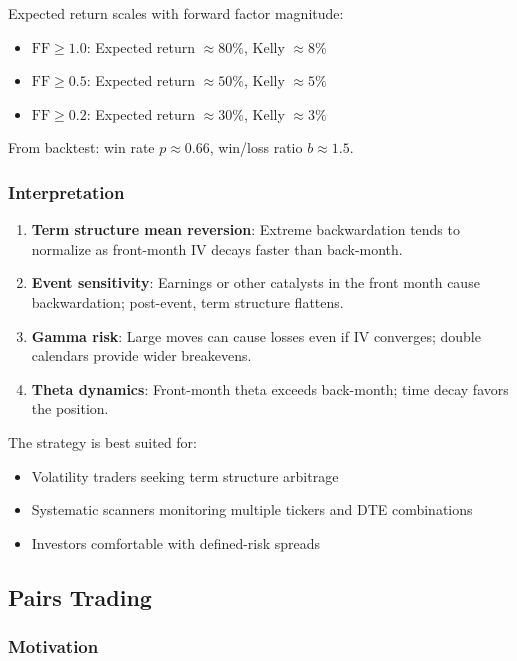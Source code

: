 Expected return scales with forward factor magnitude:
\begin{itemize}
  \item $\text{FF} \geq 1.0$: Expected return $\approx 80\%$, Kelly $\approx 8\%$
  \item $\text{FF} \geq 0.5$: Expected return $\approx 50\%$, Kelly $\approx 5\%$
  \item $\text{FF} \geq 0.2$: Expected return $\approx 30\%$, Kelly $\approx 3\%$
\end{itemize}

From backtest: win rate $p \approx 0.66$, win/loss ratio $b \approx 1.5$.

\subsubsection{Interpretation}

\begin{enumerate}
  \item \textbf{Term structure mean reversion}: Extreme backwardation tends to normalize as front-month IV decays faster than back-month.

  \item \textbf{Event sensitivity}: Earnings or other catalysts in the front month cause backwardation; post-event, term structure flattens.

  \item \textbf{Gamma risk}: Large moves can cause losses even if IV converges; double calendars provide wider breakevens.

  \item \textbf{Theta dynamics}: Front-month theta exceeds back-month; time decay favors the position.
\end{enumerate}

The strategy is best suited for:
\begin{itemize}
  \item Volatility traders seeking term structure arbitrage
  \item Systematic scanners monitoring multiple tickers and DTE combinations
  \item Investors comfortable with defined-risk spreads
\end{itemize}

\subsection{Pairs Trading}

\subsubsection{Motivation}

